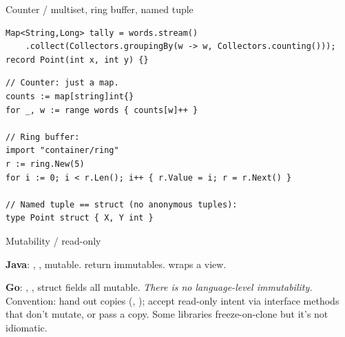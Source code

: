 \documentclass[10pt]{article}
\begin{document}

\begin{construct}{Counter / multiset, ring buffer, named tuple}
\noindent
\begin{minipage}[t]{0.485\linewidth}
\begin{lstlisting}[style=java, title=Java]
Map<String,Long> tally = words.stream()
    .collect(Collectors.groupingBy(w -> w, Collectors.counting()));
record Point(int x, int y) {}
\end{lstlisting}
\end{minipage}\hfill
\begin{minipage}[t]{0.485\linewidth}
\begin{lstlisting}[style=go, title=Go]
// Counter: just a map.
counts := map[string]int{}
for _, w := range words { counts[w]++ }

// Ring buffer:
import "container/ring"
r := ring.New(5)
for i := 0; i < r.Len(); i++ { r.Value = i; r = r.Next() }

// Named tuple == struct (no anonymous tuples):
type Point struct { X, Y int }
\end{lstlisting}
\end{minipage}
\end{construct}

\begin{construct}{Mutability / read-only}
\noindent
\begin{minipage}[t]{\linewidth}
\small
\textbf{Java}: , ,  mutable.
 return immutables. 
wraps a view.\par
\textbf{Go}: , , struct fields all mutable. \emph{There is
no language-level immutability.} Convention: hand out copies (,
); accept read-only intent via interface methods that don't
mutate, or pass a copy. Some libraries freeze-on-clone but it's not idiomatic.
\end{minipage}
\end{construct}

\end{document}
